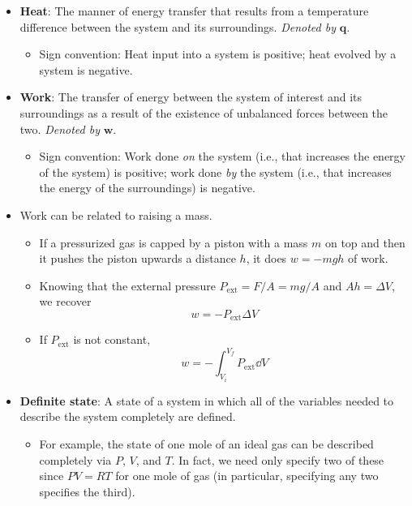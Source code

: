 \documentclass[../notes.tex]{subfiles}
\begin{document}
\begin{itemize}
    \item \textbf{Heat}: The manner of energy transfer that results from a temperature difference between the system and its surroundings. \emph{Denoted by} $\bm{q}$.
    \begin{itemize}
        \item Sign convention: Heat input into a system is positive; heat evolved by a system is negative.
    \end{itemize}
    \item \textbf{Work}: The transfer of energy between the system of interest and its surroundings as a result of the existence of unbalanced forces between the two. \emph{Denoted by} $\bm{w}$.
    \begin{itemize}
        \item Sign convention: Work done \emph{on} the system (i.e., that increases the energy of the system) is positive; work done \emph{by} the system (i.e., that increases the energy of the surroundings) is negative.
    \end{itemize}
    \item Work can be related to raising a mass.
    \begin{itemize}
        \item If a pressurized gas is capped by a piston with a mass $m$ on top and then it pushes the piston upwards a distance $h$, it does $w=-mgh$ of work.
        \item Knowing that the external pressure $P_\text{ext}=F/A=mg/A$ and $Ah=\Delta V$, we recover
        \begin{equation*}
            w = -P_\text{ext}\Delta V
        \end{equation*}
        \item If $P_\text{ext}$ is not constant,
        \begin{equation*}
            w = -\int_{V_i}^{V_f}P_\text{ext}\dd{V}
        \end{equation*}
    \end{itemize}
    \item \textbf{Definite state}: A state of a system in which all of the variables needed to describe the system completely are defined.
    \begin{itemize}
        \item For example, the state of one mole of an ideal gas can be described completely via $P$, $V$, and $T$. In fact, we need only specify two of these since $PV=RT$ for one mole of gas (in particular, specifying any two specifies the third).

\end{itemize}
\end{itemize}
\end{document}
